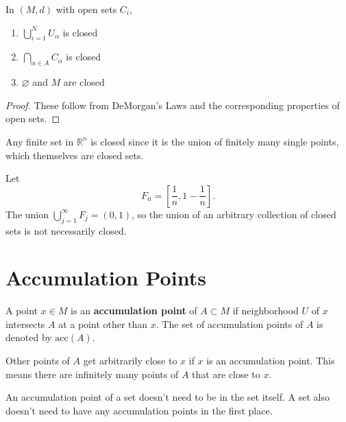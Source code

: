 \documentclass[10pt]{report}
\begin{document}
\begin{prop}
        In $(M,d)$ with open sets $C_i$,
        \begin{enumerate}
                \item $\bigcup_{i=1}^N U_\alpha$ is closed
                \item $\bigcap_{\alpha\in A} C_\alpha$ is closed
                \item $\varnothing$ and $M$ are closed
        \end{enumerate}
\end{prop}
\begin{proof}
	These follow from DeMorgan's Laws and the corresponding properties of open sets.
\end{proof}

\begin{ex}[]
Any finite set in $\mathbb{R}^n$ is closed since it is the union of finitely many single points, which themselves are closed sets.
\end{ex}

\begin{ex}[]
	Let \[F_n = \left[\frac{1}{n}, 1-\frac{1}{n}\right] .\] The union $\bigcup_{j=1}^\infty F_j = (0,1)$, so the union of an arbitrary collection of closed sets is not necessarily closed.
\end{ex}

\pagebreak


\section{Accumulation Points}
\begin{defn}[]
	A point $x \in M$ is an \textbf{accumulation point} of $A \subset M$ if neighborhood $U$ of $x$ intersects $A$ at a point other than $x$. The set of accumulation points of $A$ is denoted by $\text{acc}(A)$.
\end{defn}

Other points of $A$ get arbitrarily close to $x$ if $x$ is an accumulation point. This means there are infinitely many points of $A$ that are close to $x$.

An accumulation point of a set doesn't need to be in the set itself. A set also doesn't need to have any accumulation points in the first place.
\end{document}
